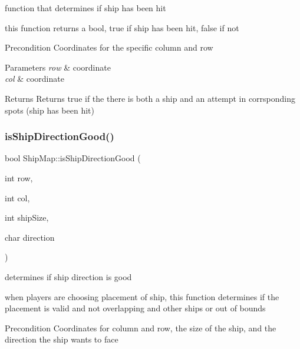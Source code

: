function that determines if ship has been hit

this function returns a bool, true if ship has been hit, false if not \begin{DoxyPrecond}{Precondition}
Coordinates for the specific column and row 
\end{DoxyPrecond}

\begin{DoxyParams}{Parameters}
{\em row} & coordinate \\
\hline
{\em col} & coordinate \\
\hline
\end{DoxyParams}
\begin{DoxyReturn}{Returns}
Returns true if the there is both a ship and an attempt in corrsponding spots (ship has been hit) 
\end{DoxyReturn}
\mbox{\label{classShipMap_a881a6669552d2fba7d88f53c1ef21985}} 
\subsubsection{\texorpdfstring{is\+Ship\+Direction\+Good()}{isShipDirectionGood()}}
{\footnotesize\ttfamily bool Ship\+Map\+::is\+Ship\+Direction\+Good (\begin{DoxyParamCaption}\item[{int}]{row,  }\item[{int}]{col,  }\item[{int}]{ship\+Size,  }\item[{char}]{direction }\end{DoxyParamCaption})}

determines if ship direction is good

when players are choosing placement of ship, this function determines if the placement is valid and not overlapping and other ships or out of bounds \begin{DoxyPrecond}{Precondition}
Coordinates for column and row, the size of the ship, and the direction the ship wants to face 
\end{DoxyPrecond}

